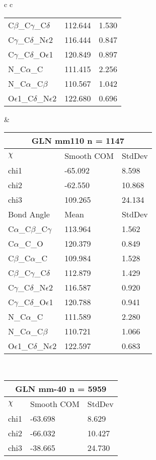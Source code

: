 \begin{longtable}{ c c }
\begin{tabular}{ l l l }
  C$\beta$\_C$\gamma$\_C$\delta$ & 112.644 & 1.530\\
  C$\gamma$\_C$\delta$\_N$\epsilon$2 & 116.444 & 0.847\\
  C$\gamma$\_C$\delta$\_O$\epsilon$1 & 120.849 & 0.897\\
  N\_C$\alpha$\_C & 111.415 & 2.256\\
  N\_C$\alpha$\_C$\beta$ & 110.567 & 1.042\\
  O$\epsilon$1\_C$\delta$\_N$\epsilon$2 & 122.680 & 0.696\\
  \bottomrule
  \end{tabular}
  &
  \begin{tabular}{ l l l }
  \toprule
  \multicolumn{3}{c}{GLN \textbf{mm110} n = 1147} \\ \toprule
  $\chi$       & Smooth COM & StdDev \\ \midrule
  chi1 & -65.092 & 8.598 \\ 
  chi2 & -62.550 & 10.868 \\ 
  chi3 & 109.265 & 24.134 \\ \midrule
  Bond Angle   & Mean     & StdDev \\ \midrule
  C$\alpha$\_C$\beta$\_C$\gamma$ & 113.964 & 1.562\\
  C$\alpha$\_C\_O & 120.379 & 0.849\\
  C$\beta$\_C$\alpha$\_C & 109.984 & 1.528\\
  C$\beta$\_C$\gamma$\_C$\delta$ & 112.879 & 1.429\\
  C$\gamma$\_C$\delta$\_N$\epsilon$2 & 116.587 & 0.920\\
  C$\gamma$\_C$\delta$\_O$\epsilon$1 & 120.788 & 0.941\\
  N\_C$\alpha$\_C & 111.589 & 2.280\\
  N\_C$\alpha$\_C$\beta$ & 110.721 & 1.066\\
  O$\epsilon$1\_C$\delta$\_N$\epsilon$2 & 122.597 & 0.683\\
  \bottomrule
  \end{tabular}
  \\
  \begin{tabular}{ l l l }
  \toprule
  \multicolumn{3}{c}{GLN \textbf{mm-40} n = 5959} \\ \toprule
  $\chi$       & Smooth COM & StdDev \\ \midrule
  chi1 & -63.698 & 8.629 \\ 
  chi2 & -66.032 & 10.427 \\ 
  chi3 & -38.665 & 24.730 \\ \midrule

\end{tabular}
\end{longtable}
